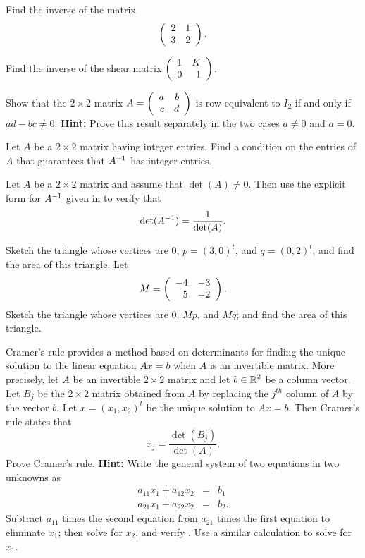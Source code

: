 \documentclass{ximera}
\begin{document}
\TEXER

\begin{exercise} \label{c4.9.1}
Find the inverse of the matrix
\[
\left(\begin{array}{rr} 2 & 1\\ 3 &2\end{array}\right).
\]
\end{exercise}

\begin{exercise} \label{c7.8.4}
Find the inverse of the shear matrix $\left(\begin{array}{rr} 1 & K\\ 0 &1\end{array}\right)$.
\end{exercise}

\begin{exercise} \label{c4.9.4}
Show that the $2\times 2$ matrix $A=\left(\begin{array}{rr} a & b\\ c &d\end{array}\right)$ is row
equivalent to $I_2$ if and only if $ad-bc\neq 0$.  {\bf Hint:}
Prove this result separately in the two cases $a\neq 0$ and
$a=0$.
\end{exercise}

\begin{exercise} \label{c4.9.5}
Let $A$ be a $2\times 2$ matrix having integer entries.  Find a
condition on the entries of $A$ that guarantees that $A^{-1}$ has
integer entries.
\end{exercise}

\begin{exercise} \label{c6.4.4}
Let $A$ be a $2\times 2$ matrix and assume that $\det(A)\neq 0$.
Then use the explicit form for $A^{-1}$ given in 
to verify that
\[
\det(A^{-1}) = \frac{1}{\det(A)}.
\]
\end{exercise}

\begin{exercise} \label{c7.8.3}
Sketch the triangle whose vertices are $0$, $p=(3,0)^t$, and
$q=(0,2)^t$; and find the area of this triangle.  Let
\[
M=\left(\begin{array}{rr} -4 & -3\\ 5 &-2\end{array}\right).
\]
Sketch the triangle whose vertices are $0$, $Mp$, and $Mq$; and
find the area of this triangle.
\end{exercise}

\begin{exercise} \label{c7.8.4A}
Cramer's rule  provides a method based on determinants 
for finding the unique solution to the linear equation $Ax=b$ when $A$ is 
an invertible matrix.  More precisely, let $A$ be an invertible $2\times 2$ 
matrix and let $b\in\mbox{$\Bbb{R}$}^2$ be a column vector. Let $B_j$ be the $2\times 2$ 
matrix obtained from $A$ by replacing the $j^{th}$ column of $A$ by the vector 
$b$.  Let $x=(x_1,x_2)^t$ be the unique solution to $Ax=b$. Then Cramer's rule
states that 
\begin{equation}  \label{E:cramer}
x_j = \frac{\det(B_j)}{\det(A)}.
\end{equation}
Prove Cramer's rule.  {\bf Hint:}  Write the general system of two equations in 
two unknowns as
\begin{eqnarray*}
a_{11}x_1+a_{12}x_2 & = & b_1\\
a_{21}x_1+a_{22}x_2 & = & b_2.
\end{eqnarray*}
Subtract $a_{11}$ times the second equation from $a_{21}$ times the first 
equation to eliminate $x_1$; then solve for $x_2$, and verify .  
Use a similar calculation to solve for $x_1$. 
\end{exercise}
\end{document}
